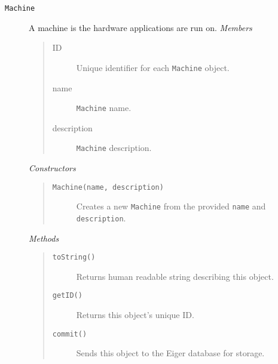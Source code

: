 \begin{description}
\item[\texttt{Machine}] A machine is the hardware applications are run on.
  {\em Members}
	\begin{quote}
	\begin{description}
    \item[ID] Unique identifier for each \texttt{Machine} object.
    \item[name] \texttt{Machine} name.
    \item[description] \texttt{Machine} description.
	\end{description}
	\end{quote}
  {\em Constructors}
	\begin{quote}
	\begin{description}
    \item[\texttt{Machine(name, description)}] Creates a new \texttt{Machine} from the provided \texttt{name} and \texttt{description}.
	\end{description}
	\end{quote}
	{\em Methods}
	\begin{quote}
	\begin{description}
		\item[\texttt{toString()}] Returns human readable string describing this object.
		\item[\texttt{getID()}] Returns this object's unique ID.
	\item[\texttt{commit()}] Sends this object to the Eiger database for storage.
	\end{description}
	\end{quote}


\end{description}
